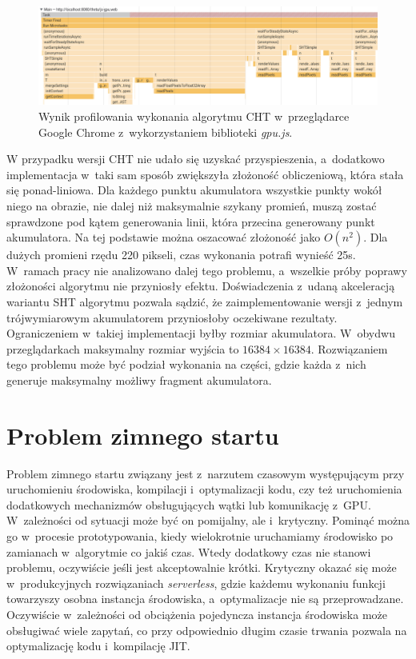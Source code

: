 

\begin{figure}[h]
    \centering
    \includegraphics[width=\linewidth]{img/gpu-profiler.png}
    \caption{Wynik profilowania wykonania algorytmu CHT w~przeglądarce Google Chrome z~wykorzystaniem biblioteki \textit{gpu.js}.}
    \label{fig:profiler-gpu}
\end{figure}


W przypadku wersji CHT nie udało się uzyskać przyspieszenia, a~dodatkowo implementacja w~taki sam sposób zwiększyła złożoność obliczeniową, która stała się ponad-liniowa. Dla każdego punktu akumulatora wszystkie punkty wokół niego na obrazie, nie dalej niż maksymalnie szykany promień, muszą zostać sprawdzone pod kątem generowania linii, która przecina generowany punkt akumulatora. Na tej podstawie można oszacować złożoność jako $O(n^2)$. Dla dużych promieni rzędu 220 pikseli, czas wykonania potrafi wynieść 25s. W~ramach pracy nie analizowano dalej tego problemu, a~wszelkie próby poprawy złożoności algorytmu nie przyniosły efektu. Doświadczenia z~udaną akceleracją wariantu SHT algorytmu pozwala sądzić, że zaimplementowanie wersji z~jednym trójwymiarowym akumulatorem przyniosłoby oczekiwane rezultaty. Ograniczeniem w~takiej implementacji byłby rozmiar akumulatora. W~obydwu przeglądarkach maksymalny rozmiar wyjścia to $16384\times16384$. Rozwiązaniem tego problemu może być podział wykonania na części, gdzie każda z~nich generuje maksymalny możliwy fragment akumulatora.

\section{Problem zimnego startu}
\label{sec:coldstart}

Problem zimnego startu związany jest z~narzutem czasowym występującym przy uruchomieniu środowiska, kompilacji i~optymalizacji kodu, czy też uruchomienia dodatkowych mechanizmów obsługujących wątki lub komunikację z~GPU. W~zależności od sytuacji może być on pomijalny, ale i~krytyczny. Pominąć można go w~procesie prototypowania, kiedy wielokrotnie uruchamiamy środowisko po zamianach w~algorytmie co jakiś czas. Wtedy dodatkowy czas nie stanowi problemu, oczywiście jeśli jest akceptowalnie krótki. Krytyczny okazać się może w~produkcyjnych rozwiązaniach \textit{serverless}, gdzie każdemu wykonaniu funkcji towarzyszy osobna instancja środowiska, a~optymalizacje nie są przeprowadzane. Oczywiście w~zależności od obciążenia pojedyncza instancja środowiska może obsługiwać wiele zapytań, co przy odpowiednio długim czasie trwania pozwala na optymalizację kodu i~kompilację JIT.

